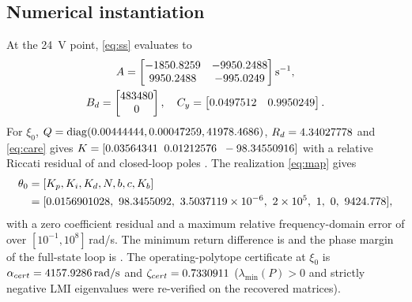 \subsection{Numerical instantiation}\label{sec:instantiation}
At the \SI{24}{V} point, \eqref{eq:ss} evaluates to
\begin{equation}
\begin{gathered}
A=\begin{bmatrix}\Aa&\Ab\\\Ac&\Ad\end{bmatrix}\si{s^{-1}},\\
B_d=\begin{bmatrix}\Bd\\0\end{bmatrix},\quad
C_y=\begin{bmatrix}\Cya&\Cyb\end{bmatrix}.
\end{gathered}
\end{equation}
For $\xi_0$, $Q=\mathrm{diag}(\Qa,\Qb,\Qc)$, $R_d=\Rd$ and \eqref{eq:care} gives
$K=[\Ka\;\;\Kb\;\;\Kc]$ with a relative Riccati residual of \CAREres{} and
closed-loop poles \Poles{}. The realization \eqref{eq:map} gives
\begin{equation}
\begin{aligned}
\theta_0&=[K_p,K_i,K_d,N,b,c,K_b]\\
&=[\ThA,\ \ThB,\ \ThC,\ 2\times10^{5},\ 1,\ 0,\ \ThG],
\end{aligned}
\end{equation}
with a zero coefficient residual and a maximum relative frequency-domain error of
\FreqErr{} over $[10^{-1},10^{8}]$\,rad/s. The minimum return difference is
\RDmin{} and the phase margin of the full-state loop is \PMdeg. The
operating-polytope certificate at $\xi_0$ is
$\alpha_{cert}=\SI{\AlphaCert}{rad/s}$ and $\zeta_{cert}=\ZetaCert$
($\lambda_{\min}(P)>0$ and strictly negative LMI eigenvalues were re-verified on
the recovered matrices).
